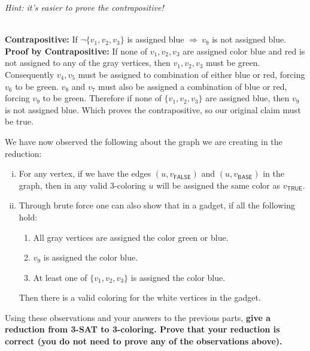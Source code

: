 \documentclass[11pt]{article}
\begin{document}
\begin{subparts}
\emph{Hint: it's easier to prove the contrapositive!}\\
\begin{solution}\\
    \textbf{Contrapositive:} If $\lnot \{v_1, v_2, v_3\}$ is assigned blue $\Rightarrow ~v_9$ is not assigned blue.\\
    \textbf{Proof by Contrapositive: }If none of $v_1, v_2, v_3$ are assigned color blue and red is not assigned to any of the gray vertices, then $v_1, v_2, v_3$ must be green. Consequently $v_4, v_5$ must be assigned to combination of either blue or red, 
    forcing $v_6$ to be green. $v_8$ and $v_7$ must also be assigned a combination of blue or red, forcing $v_9$ to be green. Therefore if none of $\{v_1, v_2, v_3\}$ are assigned blue, then $v_9$ is not assigned blue. Which proves the 
    contrapositive, so our original claim must be true.
\end{solution}

\subpart We have now observed the following about the graph we are creating in the reduction:
\begin{enumerate}[(i)]
\item For any vertex, if we have the edges $(u, v_{\textsf{FALSE}})$ and $(u, v_{\textsf{BASE}})$ in the graph, then in any valid 3-coloring $u$ will be assigned the same color as $v_{\textsf{TRUE}}$. 

\item Through brute force one can also show that in a gadget, if all the following hold:
\begin{enumerate}[(1)]
\item All gray vertices are assigned the color  green or blue.
\item $v_9$ is assigned the color blue.
\item At least one of $\{v_1, v_2, v_3\}$ is assigned the color blue.
\end{enumerate}
Then there is a valid coloring for the white vertices in the gadget. 
\end{enumerate}

Using these observations and your answers to the previous parts, \textbf{give
a reduction from 3-SAT to 3-coloring. Prove that your reduction is correct (you do not need to prove any of the observations above). }


\end{subparts}
\end{document}
